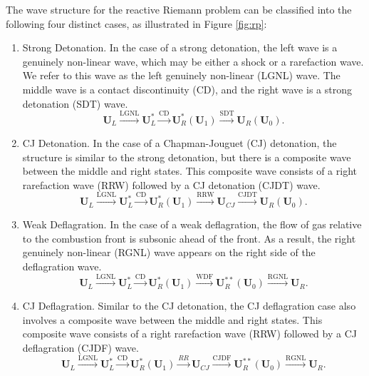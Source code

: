 The wave structure for the reactive Riemann problem can be classified into the following four distinct cases, as illustrated in Figure \ref{fig:rp}:
\begin{enumerate}
  \item Strong Detonation.
  In the case of a strong detonation, the left wave is a genuinely non-linear wave, which may be either a shock or a rarefaction wave. We refer to this wave as the left genuinely non-linear (LGNL) wave. The middle wave is a contact discontinuity (CD), and the right wave is a strong detonation (SDT) wave.
  \[
  \boldsymbol{U}_L 
  \xrightarrow{\text{LGNL}}
  \boldsymbol{U}_L^*
  \xrightarrow{\text{CD}}
  \boldsymbol{U}_R^* (\boldsymbol{U}_1)
  \xrightarrow{\text{SDT}}
  \boldsymbol{U}_R (\boldsymbol{U}_0).
  \]

  \item CJ Detonation.
  In the case of a Chapman-Jouguet (CJ) detonation, the structure is similar to the strong detonation, but there is a composite wave between the middle and right states. This composite wave consists of a right rarefaction wave (RRW) followed by a CJ detonation (CJDT) wave.
  \[
    \boldsymbol{U}_L 
  \xrightarrow{\text{LGNL}}
  \boldsymbol{U}_L^*
  \xrightarrow{\text{CD}}
  \boldsymbol{U}_R^* (\boldsymbol{U}_1)
  \xrightarrow{\text{RRW}}
  \boldsymbol{U}_{CJ}
  \xrightarrow{\text{CJDT}}
  \boldsymbol{U}_R (\boldsymbol{U}_0).
  \]
  \item Weak Deflagration.
  In the case of a weak deflagration, the flow of gas relative to the combustion front is subsonic ahead of the front. As a result, the right genuinely non-linear (RGNL) wave appears on the right side of the deflagration wave.
  \[
    \boldsymbol{U}_L 
    \xrightarrow{\text{LGNL}}
    \boldsymbol{U}_L^*
    \xrightarrow{\text{CD}}
    \boldsymbol{U}_R^* (\boldsymbol{U}_1)
    \xrightarrow{\text{WDF}}
    \boldsymbol{U}_R^{**} (\boldsymbol{U}_0)
    \xrightarrow{\text{RGNL}}
    \boldsymbol{U}_R.
    \]
  \item CJ Deflagration.
  Similar to the CJ detonation, the CJ deflagration case also involves a composite wave between the middle and right states. This composite wave consists of a right rarefaction wave (RRW) followed by a CJ deflagration (CJDF) wave.
  \[
    \boldsymbol{U}_L 
    \xrightarrow{\text{LGNL}}
    \boldsymbol{U}_L^*
    \xrightarrow{\text{CD}}
    \boldsymbol{U}_R^* (\boldsymbol{U}_1)
    \xrightarrow{RR}
    \boldsymbol{U}_{CJ}
    \xrightarrow{\text{CJDF}}
    \boldsymbol{U}_R^{**} (\boldsymbol{U}_0)
    \xrightarrow{\text{RGNL}}
    \boldsymbol{U}_R.
    \]
\end{enumerate}


